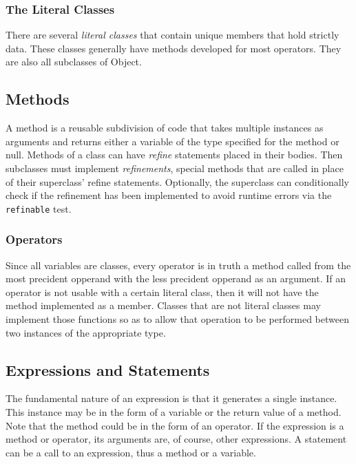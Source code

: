 \subsubsection{The Literal Classes}
There are several \textit{literal classes} that contain unique members that hold strictly data. These classes generally have methods developed for most operators. They are also all subclasses of Object.

\subsection{Methods}
A method is a reusable subdivision of code that takes multiple instances as arguments and returns either a variable of the type specified for the method or null. Methods of a class can have \textit{refine} statements placed in their bodies. Then subclasses must implement \textit{refinements}, special methods that are called in place of their superclass' refine statements. Optionally, the superclass can conditionally check if the refinement has been implemented to avoid runtime errors via the \verb!refinable! test.

\subsubsection{Operators}
Since all variables are classes, every operator is in truth a method called from the most precident opperand with the less precident opperand as an argument. If an operator is not usable with a certain literal class, then it will not have the method implemented as a member. Classes that are not literal classes may implement those functions so as to allow that operation to be performed between two instances of the appropriate type.

\subsection{Expressions and Statements}
The fundamental nature of an expression is that it generates a single instance. This instance may be in the form of a variable or the return value of a method. Note that the method could be in the form of an operator. If the expression is a method or operator, its arguments are, of course, other expressions. A statement can be a call to an expression, thus a method or a variable.